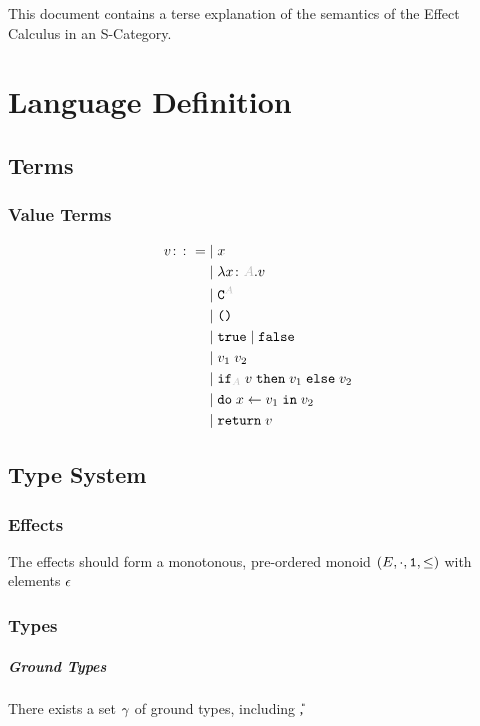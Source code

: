 \documentclass{report}
\begin{document}

\abstract
This document contains a terse explanation of the semantics of the Effect Calculus in an S-Category.

\tableofcontents
\chapter{Language Definition}

\section{Terms}
\subsection{Value Terms}

\begin{equation}
    \begin{split}
        v \gens& \mid  x \\
        & \mid \lam{x}{A}{v} \\
        & \mid \const{A} \\
        & \mid \u \\
        & \mid \t \mid \f \\
        & \mid \apply{v_1}{v_2} \\
        & \mid \pifthenelse{A}{v}{v_1}{v_2} \\
        & \mid \doin{x}{v_1}{v_2} \\
        & \mid \return{v}
        \end{split}
    \end{equation}

\section{Type System}
\subsection{Effects}
The effects should form a monotonous, pre-ordered monoid $(E, \cdot, \texttt{1}, \leq)$ with elements $\epsilon$
\subsection{Types}
    \paragraph{Ground Types}
        There exists a set $\gamma$ of ground types, including \U, \B
\end{document}

